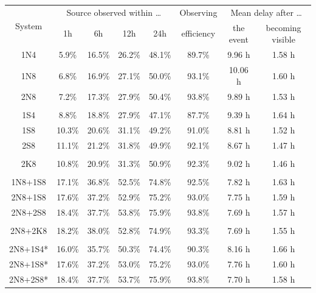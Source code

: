 \begin{colsection}
\begin{colsection}
\begin{table}[p]
    \begin{center}
        \begin{tabular}{c|cccc|c|cc} %
            \multirow{2}{*}{System} &
            \multicolumn{4}{c|}{Source observed within \ldots} &
            {\small Observing} &
            \multicolumn{2}{c}{Mean delay after \ldots} \\
                & 1h & 6h & 12h & 24h & efficiency & {\small the event} & {\small becoming visible} \\
            \midrule
                 1N4 &  5.9\% & 16.5\% & 26.2\% & 48.1\% & 89.7\% &  9.96 h & 1.58 h \\
                 1N8 &  6.8\% & 16.9\% & 27.1\% & 50.0\% & 93.1\% & 10.06 h & 1.60 h \\
                 2N8 &  7.2\% & 17.3\% & 27.9\% & 50.4\% & 93.8\% &  9.89 h & 1.53 h \\
            &&&&&&&\\
                 1S4 &  8.8\% & 18.8\% & 27.9\% & 47.1\% & 87.7\% &  9.39 h & 1.64 h \\
                 1S8 & 10.3\% & 20.6\% & 31.1\% & 49.2\% & 91.0\% &  8.81 h & 1.52 h \\
                 2S8 & 11.1\% & 21.2\% & 31.8\% & 49.9\% & 92.1\% &  8.67 h & 1.47 h \\
            &&&&&&&\\
                 2K8 & 10.8\% & 20.9\% & 31.3\% & 50.9\% & 92.3\% &  9.02 h & 1.46 h \\
            &&&&&&&\\
             1N8+1S8 & 17.1\% & 36.8\% & 52.5\% & 74.8\% & 92.5\% &  7.82 h & 1.63 h \\
             2N8+1S8 & 17.6\% & 37.2\% & 52.9\% & 75.2\% & 93.0\% &  7.75 h & 1.59 h \\
             2N8+2S8 & 18.4\% & 37.7\% & 53.8\% & 75.9\% & 93.8\% &  7.69 h & 1.57 h \\
            &&&&&&&\\
            2N8+2K8  & 18.2\% & 38.0\% & 52.8\% & 74.9\% & 93.3\% &  7.69 h & 1.55 h \\
            &&&&&&&\\
            2N8+1S4* & 16.0\% & 35.7\% & 50.3\% & 74.4\% & 90.3\% &  8.16 h & 1.66 h \\
            2N8+1S8* & 17.6\% & 37.2\% & 53.0\% & 75.2\% & 93.0\% &  7.76 h & 1.60 h \\
            2N8+2S8* & 18.4\% & 37.7\% & 53.7\% & 75.9\% & 93.8\% &  7.70 h & 1.58 h \\

\end{tabular}
\end{center}
\end{table}
\end{colsection}
\end{colsection}
